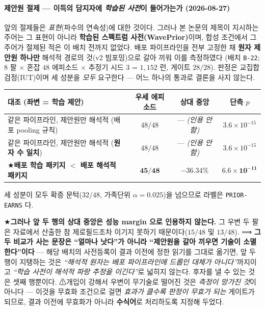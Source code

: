 \documentclass[11pt]{report}
\numberwithin{equation}{chapter}
\numberwithin{figure}{chapter}
\numberwithin{table}{chapter}
\begin{document}
\paragraph{제안원 절제 --- 이득의 담지자에 \emph{학습된 사전}이 들어가는가 (2026-08-27)}
\label{sec:ablation_prior}
앞의 절제들은 \emph{표현}(파수의 연속성)에 대한 것이다. 그러나 본 논문의 제목이
지시하는 주어는 그 표현이 아니라 \textbf{학습된 스펙트럼 사전(WavePrior)}이며, 합성
조건에서 그 주어가 절제된 적은 이 배치 전까지 없었다. 배포 파이프라인을 전부 고정한 채
\textbf{원자 제안원 하나만} 해석적 경로의 것(v2 빔포밍)으로 갈아 끼워 이를 측정하였다
(배치 \texttt{B-22}; $8$ 팔 $\times$ 혼잡 $48$ 에피소드 $\times$ 추정기 시드 $3$
= $1{,}152$ 런, 게이트 $28/28$). 판정은 교집합 검정(IUT)이며 세 성분을 \emph{모두}
요구한다 --- 어느 하나의 통과로 결론을 사지 않는다.

\begin{center}
\small
\setlength{\tabcolsep}{4pt}
\begin{tabular}{p{}ccc}
\toprule
대조 (좌변 = 학습 제안) & 우세 에피소드 & 상대 중앙 & 단측 $p$ \\
\midrule
같은 파이프라인, 제안원만 해석적 (배포 pooling 규칙) & $48/48$ & --- \emph{(인용 안 함)} & $3.6\times10^{-15}$ \\
같은 파이프라인, 제안원만 해석적 (\textbf{원자 수 일치}) & $48/48$ & --- \emph{(인용 안 함)} & $3.6\times10^{-15}$ \\
★\textbf{배포 학습 패키지 $<$ 배포 해석적 패키지} & $\mathbf{45/48}$ & $\mathbf{-36.34\%}$ & $\mathbf{6.6\times10^{-11}}$ \\
\bottomrule
\end{tabular}
\end{center}

세 성분이 모두 확증 문턱($32/48$, 가족단위 $\alpha = 0.025$)을 넘으므로 라벨은
\texttt{PRIOR-EARNS} 다.

★\textbf{그러나 앞 두 행의 상대 중앙은 성능 margin 으로 인용하지 않는다.} 그 우변 두
팔은 자료에서 산출한 참 제로필드조차 이기지 못하기 때문이다($15/48$ 및 $13/48$).
⟹ \textbf{그 두 비교가 사는 문장은 ``얼마나 낫다''가 아니라 ``제안원을 갈아 끼우면
기술이 소멸한다''이다} --- 해당 배치의 사전등록이 결과 이전에 정한 읽기를 그대로 옮기면,
앞 두 행이 지탱하는 것은 \emph{``해석적 원자는 배포 파이프라인에 드롭인 대체가
아니다''}까지이고 \emph{``학습 사전이 해석적 파랑 추정을 이긴다''}로 넓히지 않는다.
후자를 낼 수 있는 것은 셋째 행뿐이다. ⚠개입이 강해서 우변이 무기술로 떨어진 것은
\emph{측정이 망가진 것}이 아니다 --- 이것을 무효화 조건으로 걸면
\emph{효과가 클수록 판정이 무효가 되는} 게이트가 되므로, 결과 이전에 무효화가 아니라
\textbf{수식어}로 처리하도록 지정해 두었다.
\end{document}
